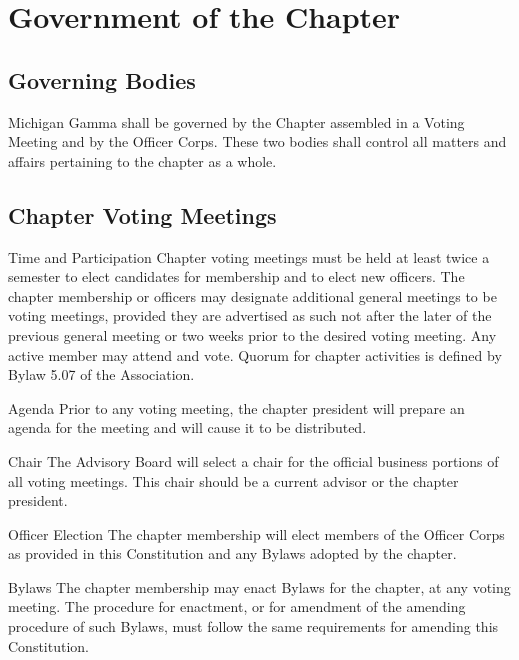\chapter{Government of the Chapter}

\section{Governing Bodies}
Michigan Gamma shall be governed by the Chapter assembled in a Voting Meeting and by the Officer Corps. These two bodies shall control all matters and affairs pertaining to the chapter as a whole.

\section{Chapter Voting Meetings}
\begin{enumsubsection}
\item{Time and Participation} Chapter voting meetings must be held at least twice a semester to elect candidates for membership and to elect new officers. The chapter membership or officers may designate additional general meetings to be voting meetings, provided they are advertised as such not after the later of the previous general meeting or two weeks prior to the desired voting meeting. Any active member may attend and vote. Quorum for chapter activities is defined by Bylaw 5.07 of the Association.

\item{Agenda}
Prior to any voting meeting, the chapter president will prepare an agenda for the meeting and will cause it to be distributed.

\item{Chair}
The Advisory Board will select a chair for the official business portions of all voting meetings. This chair should be a current advisor or the chapter president.

\item{Officer Election}
The chapter membership will elect members of the Officer Corps as provided in this Constitution and any Bylaws adopted by the chapter.

\item{Bylaws}
The chapter membership may enact Bylaws for the chapter, at any voting meeting. The procedure for enactment, or for amendment of the amending procedure of such Bylaws, must follow the same requirements for amending this Constitution.

\end{enumsubsection}
